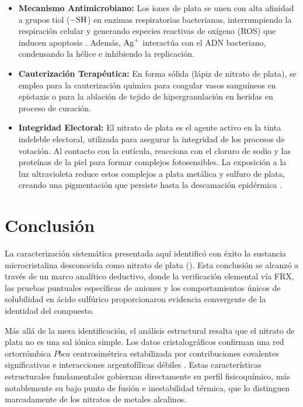 \documentclass[pdflatex,sn-mathphys-num]{sn-jnl}
\theoremstyle{thmstyleone}%
\theoremstyle{thmstyletwo}%
\theoremstyle{thmstylethree}%
\begin{document}
\begin{itemize}
  \item \textbf{Mecanismo Antimicrobiano:} Los iones de plata se unen con alta
    afinidad a grupos tiol ($\ce{-SH}$) en enzimas respiratorias bacterianas,
    interrumpiendo la respiración celular y generando especies reactivas de
    oxígeno (ROS) que inducen apoptosis \cite{Morones2005, Pandian2010}. Además,
    $\ce{Ag+}$ interactúa con el ADN bacteriano, condensando la hélice e
    inhibiendo la replicación.

  \item \textbf{Cauterización Terapéutica:} En forma sólida (lápiz de nitrato
    de plata), se emplea para la cauterización química para coagular vasos
    sanguíneos en epistaxis o para la ablación de tejido de hipergranulación en
    heridas en proceso de curación.

  \item \textbf{Integridad Electoral:} El nitrato de plata es el agente activo
    en la tinta indeleble electoral, utilizada para asegurar la integridad de
    los procesos de votación. Al contacto con la cutícula, reacciona con el
    cloruro de sodio y las proteínas de la piel para formar complejos
    fotosensibles. La exposición a la luz ultravioleta reduce estos complejos a
    plata metálica y sulfuro de plata, creando una pigmentación que persiste
    hasta la descamación epidérmica \cite{Nandwani2025}.
\end{itemize}

\section{Conclusión}
\label{sec:conclusion}

La caracterización sistemática presentada aquí identificó con éxito la sustancia
microcristalina desconocida como nitrato de plata (). Esta conclusión
se alcanzó a través de un marco analítico deductivo, donde la verificación
elemental vía FRX, las pruebas puntuales específicas de aniones y los
comportamientos únicos de solubilidad en ácido sulfúrico proporcionaron
evidencia convergente de la identidad del compuesto.

Más allá de la mera identificación, el análisis estructural resalta que el
nitrato de plata no es una sal iónica simple. Los datos cristalográficos
confirman una red ortorrómbica $Pbca$ centrosimétrica estabilizada por
contribuciones covalentes significativas  e interacciones
argentofílicas débiles . Estas características estructurales
fundamentales gobiernan directamente su perfil fisicoquímico, más notablemente
su bajo punto de fusión e inestabilidad térmica, que lo distinguen marcadamente
de los nitratos de metales alcalinos.
\end{document}
